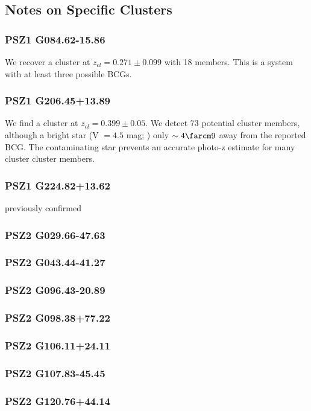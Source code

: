 \documentclass[apj, revtex4-1]{emulateapj}
\begin{document}
\subsection{Notes on Specific Clusters}

\subsubsection{PSZ1 G084.62-15.86}
We recover a cluster at $z_{cl} = 0.271 \pm 0.099$ with 18 members. This is a system with at least three possible BCGs.

\subsubsection{PSZ1 G206.45+13.89}
We find a cluster at $z_{cl} = 0.399 \pm 0.05$. We detect 73 potential cluster members, although a bright star (V $= 4.5$ mag; \citealt{Hog2000}) only $\sim4\farcm9$ away from the reported BCG. The contaminating star prevents an accurate photo-z estimate for many cluster cluster members.

\subsubsection{PSZ1 G224.82+13.62}
previously confirmed

\subsubsection{PSZ2 G029.66-47.63}
\subsubsection{PSZ2 G043.44-41.27}
\subsubsection{PSZ2 G096.43-20.89}
\subsubsection{PSZ2 G098.38+77.22}
\subsubsection{PSZ2 G106.11+24.11}
\subsubsection{PSZ2 G107.83-45.45}
\subsubsection{PSZ2 G120.76+44.14}
\end{document}
